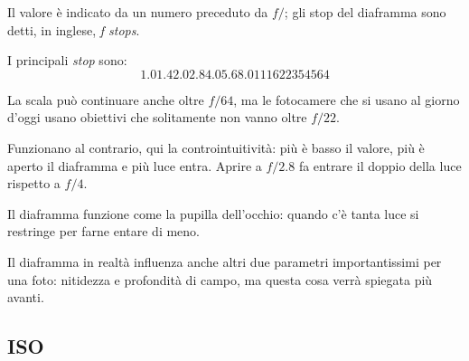 Il valore è indicato da un numero preceduto da $f/$; gli stop del diaframma sono detti, in inglese, \textit{f stops}.

I principali \textit{stop} sono:
\[ 1.0 1.4 2.0 2.8 4.0 5.6 8.0 11 16 22 35 45 64 \]

\nb La scala può continuare anche oltre $f/64$, ma le fotocamere che si usano al giorno d'oggi usano obiettivi che solitamente non vanno oltre $f/22$.

Funzionano al contrario, qui la controintuitività: più è basso il valore, più è aperto il
diaframma e più luce entra.\newline
Aprire a $f/2.8$ fa entrare il doppio della luce rispetto a $f/4$.

Il diaframma funzione come la pupilla dell'occhio: quando c'è tanta luce si restringe per farne entare di meno.

Il diaframma in realtà influenza anche altri due parametri importantissimi per una foto:
nitidezza e profondità di campo, ma questa cosa verrà spiegata più avanti.



\subsection{ISO}  \label{subsec:ISO}

